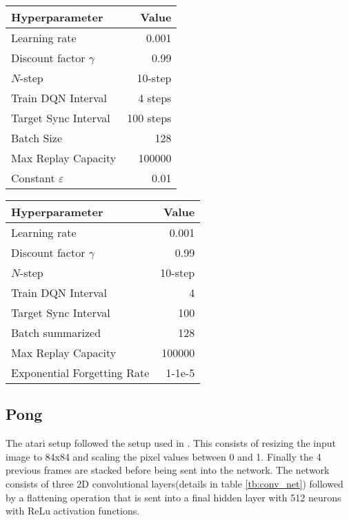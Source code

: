 {{\begin{table}[H]
    \centering
    \begin{tabular}{@{}lr@{}}
        \toprule
        Hyperparameter               & Value \\ \midrule
        Learning rate                & 0.001 \\
        Discount factor $\gamma$     & 0.99  \\
        $N$-step                     & 10-step \\
        Train DQN Interval           & 4 steps \\
        Target Sync Interval         & 100 steps \\
        Batch Size                   & 128 \\
        Max Replay Capacity          & 100000 \\ 
        Constant $\varepsilon$       & 0.01 \\ \bottomrule
    \end{tabular}
    \quad
    \begin{tabular}{@{}lr@{}}
        \toprule
        Hyperparameter               & Value \\ \midrule
        Learning rate                & 0.001 \\
        Discount factor $\gamma$     & 0.99  \\
        $N$-step                     & 10-step \\
        Train DQN Interval           & 4 \\
        Target Sync Interval         & 100 \\
        Batch summarized             & 128 \\
        Max Replay Capacity          & 100000 \\
        Exponential Forgetting Rate  & 1-1e-5 \\ \bottomrule
    \end{tabular}
\end{table}

\subsection{Pong}

The atari setup followed the setup used in \cite{mnih_2015}. This consists of resizing the input image to 84x84 and scaling the pixel values between 0 and 1. Finally the 4 previous frames are stacked before being sent into the network. The network consists of three 2D convolutional layers(details in table \ref{tb:conv_net}) followed by a flattening operation that is sent into a final hidden layer with 512 neurons with ReLu activation functions.

}}
